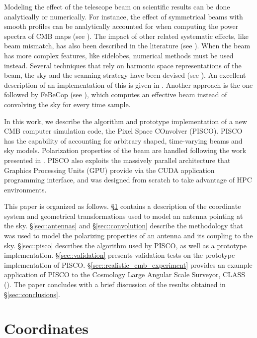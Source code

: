 \documentclass[a4paper,11pt]{article}
\begin{document}
Modeling the effect of the telescope beam on scientific results can be done analytically or numerically. For instance, the effect of symmetrical beams with smooth profiles can be analytically accounted for when computing the power spectra of CMB maps (see \cite{2003ApJS..148...39P}). The impact of other related systematic effects, like beam mismatch, has also been described in the literature (see \cite{PhysRevD.77.083003, 2007MNRAS.376.1767O, 2015JCAP...03..048D}). When the beam has more complex features, like sidelobes, numerical methods must be used instead. Several techniques that rely on harmonic space representations of the beam, the sky and the scanning strategy have been devised (see \cite{2001PhRvD..63l3002W,2000PhRvD..62l3002C}). An excellent description of an implementation of this is given in \cite{2018arXiv180905034D}. Another approach is the one followed by FeBeCop (see \cite{2011ApJS..193....5M}), which computes an effective beam instead of convolving the sky for every time sample. 

In this work, we describe the algorithm and prototype implementation of a new CMB computer simulation code, the Pixel Space COnvolver (PISCO). PISCO has the capability of accounting for arbitrary shaped, time-varying beams and sky models. Polarization properties of the beam are handled following the work presented in \cite{2007MNRAS.376.1767O}. PISCO also exploits the massively parallel architecture that Graphics Processing Units (GPU) provide via the CUDA application programming interface, and was designed from scratch to take advantage of HPC environments.

This paper is organized as follows. 
\S\ref{sec::coordinate-systems} contains a description of the coordinate system and geometrical transformations used to model an antenna pointing at the sky.
\S\ref{sec::antennas} and \S\ref{sec::convolution} describe the methodology that was used to model the polarizing properties of an antenna and its coupling to the sky.
\S\ref{sec::pisco} describes the algorithm used by PISCO, as well as a prototype implementation. 
\S\ref{sec::validation} presents validation tests on the prototype implementation of PISCO. 
\S\ref{sec::realistic_cmb_experiment} provides an example application of PISCO to the Cosmology Large Angular Scale Surveyor, CLASS (\cite{2016SPIE.9914E..1KH}). 
The paper concludes with a brief discussion of the results obtained in \S\ref{sec::conclusions}.

%
\section{Coordinates}
\label{sec::coordinate-systems}
\end{document}
